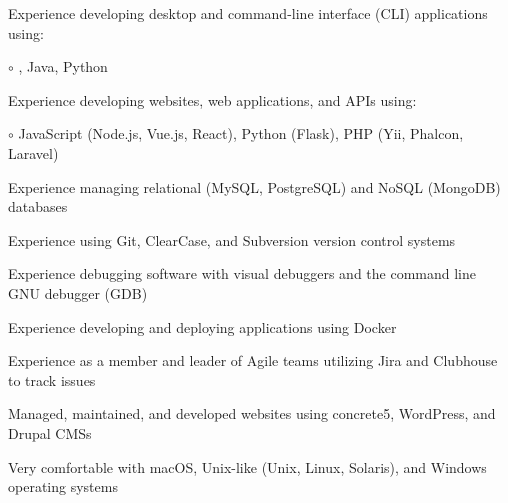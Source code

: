 \begin{itemize*}
  \item Experience developing desktop and command-line interface (CLI) applications using: %
  \begin{itemize*}
    \vspace{-0.2em}
    \item[$\circ$] \CPP, Java, Python
    \vspace{-0.2em}
  \end{itemize*}
  \item Experience developing websites, web applications, and APIs using: %
  \begin{itemize*}
    \vspace{-0.2em}
    \item[$\circ$] JavaScript (Node.js, Vue.js, React), Python (Flask), PHP (Yii, Phalcon, Laravel)
    \vspace{-0.2em}
  \end{itemize*}
  \item Experience managing relational (MySQL, PostgreSQL) and NoSQL (MongoDB) databases
  \item Experience using Git, ClearCase, and Subversion version control systems
  \item Experience debugging software with visual debuggers and the command line GNU debugger (GDB)
  \item Experience developing and deploying applications using Docker
  \item Experience as a member and leader of Agile teams utilizing Jira and Clubhouse to track issues
  \item Managed, maintained, and developed websites using concrete5, WordPress, and Drupal CMSs
  \item Very comfortable with macOS, Unix-like (Unix, Linux, Solaris), and Windows operating systems
\end{itemize*}


